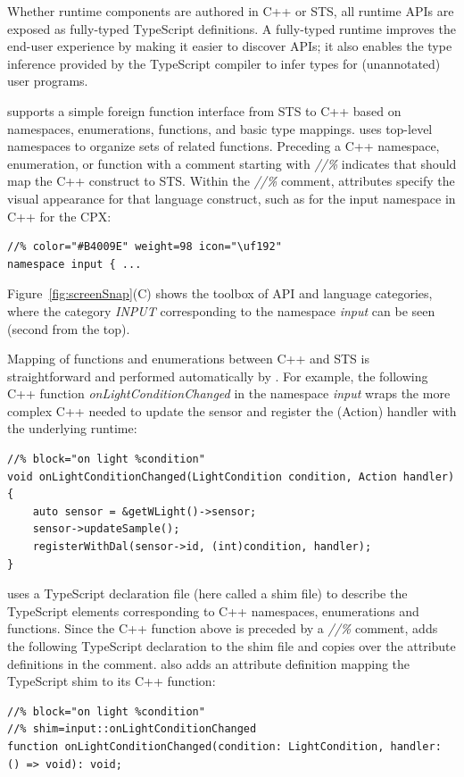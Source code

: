 Whether runtime components are authored in C++ or STS, all runtime APIs are exposed as fully-typed TypeScript definitions. A fully-typed runtime improves the end-user experience by making it easier to discover APIs; it also enables the type inference provided by the TypeScript compiler to infer types for (unannotated) user programs.

\MC supports a simple foreign function interface from STS to C++ based on namespaces, enumerations, functions, and basic type mappings. \MC uses top-level namespaces to organize sets of related functions. Preceding a C++ namespace, enumeration, or function
with a comment starting with \emph{//\%} indicates that \MC should map the C++ construct to STS.
Within the \emph{//\%} comment, attributes specify the visual appearance for that
language construct, such as for the input namespace in C++ for the CPX:

\begin{lstlisting}
//% color="#B4009E" weight=98 icon="\uf192"
namespace input { ...
\end{lstlisting}

Figure~\ref{fig:screenSnap}(C) shows the toolbox of API and language categories, where the
category \emph{INPUT} corresponding to the namespace \emph{input} can be seen (second
from the top).

Mapping of functions and enumerations between C++ and STS is straightforward
and performed automatically by \MCN.
For example, the following C++ function \emph{onLightConditionChanged}
in the namespace \emph{input}
wraps the more complex C++ needed to update the sensor and register the (Action)
handler with the underlying \CO runtime:
\begin{lstlisting}
//% block="on light %condition"
void onLightConditionChanged(LightCondition condition, Action handler) {
    auto sensor = &getWLight()->sensor;
    sensor->updateSample();
    registerWithDal(sensor->id, (int)condition, handler);
}
\end{lstlisting}

\MC uses a TypeScript declaration file (here called a shim file) to describe the TypeScript
elements corresponding to C++ namespaces, enumerations and functions.
Since the C++ function above is preceded by a \emph{//\%} comment,
\MC adds the following TypeScript declaration to the shim file and copies
over the attribute definitions in the comment. \MC also adds an attribute definition mapping
the TypeScript shim to its C++ function:

\begin{lstlisting}
//% block="on light %condition"
//% shim=input::onLightConditionChanged
function onLightConditionChanged(condition: LightCondition, handler: () => void): void;
\end{lstlisting}

